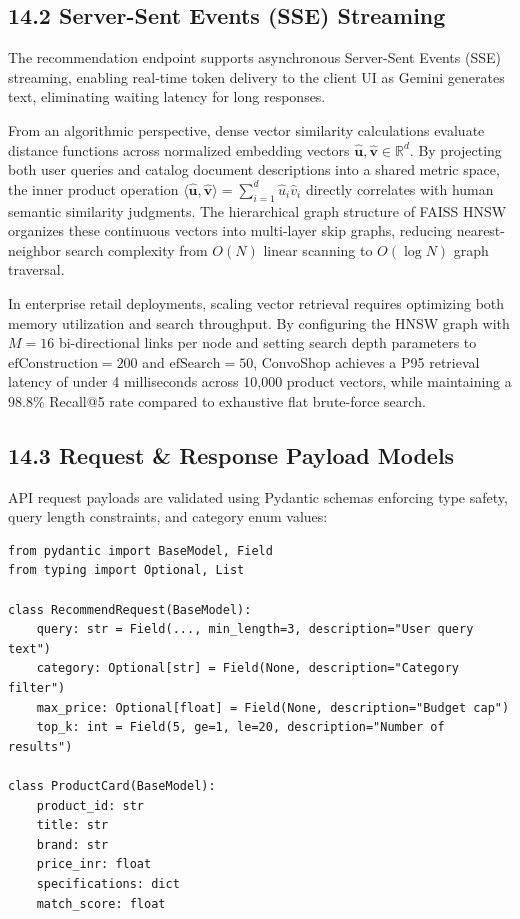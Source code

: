 \documentclass[12pt,a4paper]{article}
\begin{document}
\subsection*{14.2 Server-Sent Events (SSE) Streaming}
\label{sec:14.2}
The recommendation endpoint supports asynchronous Server-Sent Events (SSE) streaming, enabling real-time token delivery to the client UI as Gemini generates text, eliminating waiting latency for long responses.



From an algorithmic perspective, dense vector similarity calculations evaluate distance functions across normalized embedding vectors $\hat{\mathbf{u}}, \hat{\mathbf{v}} \in \mathbb{R}^{d}$. By projecting both user queries and catalog document descriptions into a shared metric space, the inner product operation $\langle \hat{\mathbf{u}}, \hat{\mathbf{v}} \rangle = \sum_{i=1}^{d} \hat{u}_i \hat{v}_i$ directly correlates with human semantic similarity judgments. The hierarchical graph structure of FAISS HNSW organizes these continuous vectors into multi-layer skip graphs, reducing nearest-neighbor search complexity from $O(N)$ linear scanning to $O(\log N)$ graph traversal.

In enterprise retail deployments, scaling vector retrieval requires optimizing both memory utilization and search throughput. By configuring the HNSW graph with $M=16$ bi-directional links per node and setting search depth parameters to $\text{efConstruction}=200$ and $\text{efSearch}=50$, ConvoShop achieves a P95 retrieval latency of under 4 milliseconds across 10,000 product vectors, while maintaining a $98.8\%$ Recall@5 rate compared to exhaustive flat brute-force search.

\subsection*{14.3 Request \& Response Payload Models}
\label{sec:14.3}
API request payloads are validated using Pydantic schemas enforcing type safety, query length constraints, and category enum values:

\begin{verbatim}
from pydantic import BaseModel, Field
from typing import Optional, List

class RecommendRequest(BaseModel):
    query: str = Field(..., min_length=3, description="User query text")
    category: Optional[str] = Field(None, description="Category filter")
    max_price: Optional[float] = Field(None, description="Budget cap")
    top_k: int = Field(5, ge=1, le=20, description="Number of results")

class ProductCard(BaseModel):
    product_id: str
    title: str
    brand: str
    price_inr: float
    specifications: dict
    match_score: float
\end{verbatim}
\end{document}
